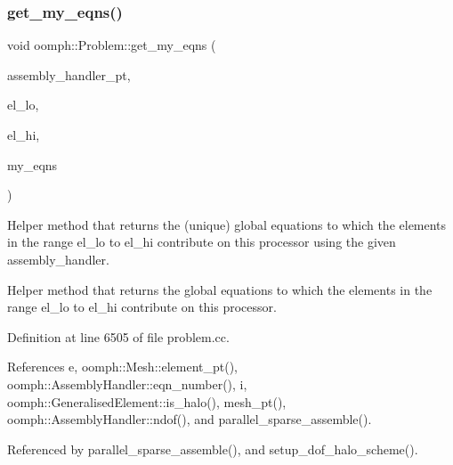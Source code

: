 \mbox{\label{classoomph_1_1Problem_ae222ce1fa229441a733d350105dfd1f7}} 
\subsubsection{\texorpdfstring{get\+\_\+my\+\_\+eqns()}{get\_my\_eqns()}}
{\footnotesize\ttfamily void oomph\+::\+Problem\+::get\+\_\+my\+\_\+eqns (\begin{DoxyParamCaption}\item[{\hyperlink{classoomph_1_1AssemblyHandler}{Assembly\+Handler} $\ast$const \&}]{assembly\+\_\+handler\+\_\+pt,  }\item[{const unsigned \&}]{el\+\_\+lo,  }\item[{const unsigned \&}]{el\+\_\+hi,  }\item[{\hyperlink{classoomph_1_1Vector}{Vector}$<$ unsigned $>$ \&}]{my\+\_\+eqns }\end{DoxyParamCaption})\hspace{0.3cm}{\ttfamily [private]}}



Helper method that returns the (unique) global equations to which the elements in the range el\+\_\+lo to el\+\_\+hi contribute on this processor using the given assembly\+\_\+handler. 

Helper method that returns the global equations to which the elements in the range el\+\_\+lo to el\+\_\+hi contribute on this processor. 

Definition at line 6505 of file problem.\+cc.



References e, oomph\+::\+Mesh\+::element\+\_\+pt(), oomph\+::\+Assembly\+Handler\+::eqn\+\_\+number(), i, oomph\+::\+Generalised\+Element\+::is\+\_\+halo(), mesh\+\_\+pt(), oomph\+::\+Assembly\+Handler\+::ndof(), and parallel\+\_\+sparse\+\_\+assemble().



Referenced by parallel\+\_\+sparse\+\_\+assemble(), and setup\+\_\+dof\+\_\+halo\+\_\+scheme().

\mbox{\label{classoomph_1_1Problem_a7300386d91390e3e5be993aca7459498}} 
